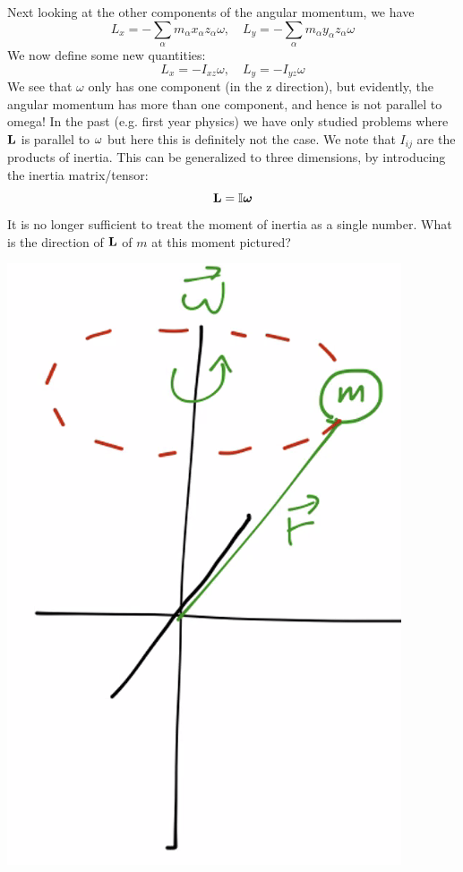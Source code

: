 \documentclass[../PHYS306Notes.tex]{subfiles}
\begin{document}
Next looking at the other components of the angular momentum, we have
\[L_x = -\sum_\alpha m_\alpha x_\alpha z_\alpha \omega, \quad L_y = -\sum_\alpha m_\alpha y_\alpha z_\alpha \omega\]
We now define some new quantities:
\[L_x = -I_{xz}\omega, \quad L_y = -I_{yz}\omega\]
We see that $\omega$ only has one component (in the z direction), but evidently, the angular momentum has more than one component, and hence is not parallel to omega! In the past (e.g. first year physics) we have only studied problems where $\mathbf{L}$ is parallel to $\mathbf{\omega}$ but here this is definitely not the case.
\newline We note that $I_{ij}$ are the products of inertia. This can be generalized to three dimensions, by introducing the inertia matrix/tensor:
\[\mathbf{L} = \mathbb{I}\bm{\omega}\]
It is no longer sufficient to treat the moment of inertia as a single number.
\newline What is the direction of $\mathbf{L}$ of $m$ at this moment pictured?
\begin{center}
    \includegraphics[scale=0.5]{Lecture-17/l17-img6.png}
\end{center}
\end{document}

